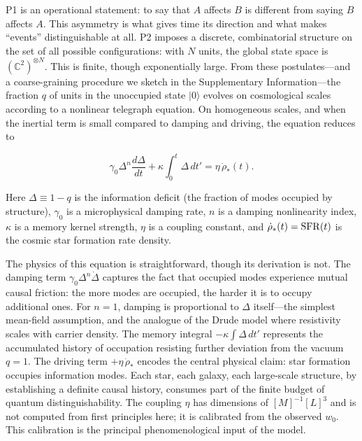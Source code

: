 \documentclass[12pt,a4paper]{article}
\begin{document}
\vspace{4pt}
\noindent P1 is an operational statement: to say that $A$ affects $B$ is different from saying $B$ affects $A$. This asymmetry is what gives time its direction and what makes ``events'' distinguishable at all. P2 imposes a discrete, combinatorial structure on the set of all possible configurations: with $N$ units, the global state space is $(\mathbb{C}^2)^{\otimes N}$. This is finite, though exponentially large. From these postulates---and a coarse-graining procedure we sketch in the Supplementary Information---the fraction $q$ of units in the unoccupied state $|0\rangle$ evolves on cosmological scales according to a nonlinear telegraph equation. On homogeneous scales, and when the inertial term is small compared to damping and driving, the equation reduces to

\begin{equation}\label{eq:ode}
\gamma_0\Delta^n\frac{d\Delta}{dt} + \kappa\int_0^t\Delta\,dt' = \eta\,\dot{\rho}_*(t).
\end{equation}

Here $\Delta\equiv1-q$ is the information deficit (the fraction of modes occupied by structure), $\gamma_0$ is a microphysical damping rate, $n$ is a damping nonlinearity index, $\kappa$ is a memory kernel strength, $\eta$ is a coupling constant, and $\dot{\rho}_*(t)={\rm SFR}(t)$ is the cosmic star formation rate density.

The physics of this equation is straightforward, though its derivation is not. The damping term $\gamma_0\Delta^n\dot{\Delta}$ captures the fact that occupied modes experience mutual causal friction: the more modes are occupied, the harder it is to occupy additional ones. For $n=1$, damping is proportional to $\Delta$ itself---the simplest mean-field assumption, and the analogue of the Drude model where resistivity scales with carrier density. The memory integral $-\kappa\int\Delta\,dt'$ represents the accumulated history of occupation resisting further deviation from the vacuum $q=1$. The driving term $+\eta\,\dot{\rho}_*$ encodes the central physical claim: star formation occupies information modes. Each star, each galaxy, each large-scale structure, by establishing a definite causal history, consumes part of the finite budget of quantum distinguishability. The coupling $\eta$ has dimensions of $[M]^{-1}[L]^3$ and is not computed from first principles here; it is calibrated from the observed $w_0$. This calibration is the principal phenomenological input of the model.
\end{document}
